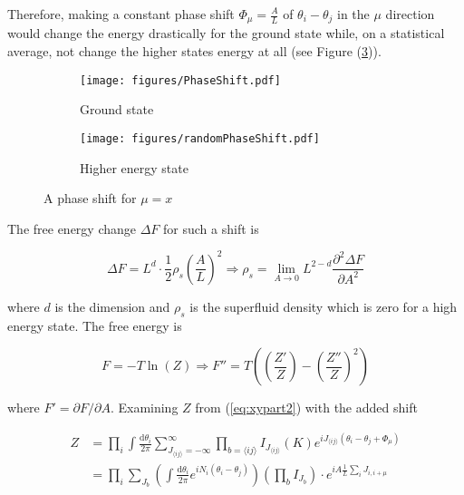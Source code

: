 Therefore, making a constant phase shift $\Phi_\mu = \frac{A}{L}$ of $\theta_i - \theta_j$ in the $\mu$ direction would change the energy drastically for the ground state while, on a statistical average, not change the higher states energy at all (see Figure (\ref{fig:xyphaseshift})).

\begin{figure}[h!]
\centering
    \begin{subfigure}{.4\textwidth}
        \centering
        \texttt{[image: figures/PhaseShift.pdf]}
        \caption{Ground state}
        \label{fig:xyground}
    \end{subfigure}
    \begin{subfigure}{.4\textwidth}
        \centering
        \texttt{[image: figures/randomPhaseShift.pdf]}
        \caption{Higher energy state}
        \label{fig:xyhigher}
    \end{subfigure}
    \caption{A phase shift for $\mu = x$}
\label{fig:xyphaseshift}
\end{figure}

The free energy change $\Delta F$ for such a shift is

\begin{equation}
    \Delta F = L^d \cdot \frac{1}{2} \rho_s \left( \frac{A}{L} \right)^2 \Rightarrow \rho_s = \lim_{A \to 0} L^{2 - d}\frac{\partial^2 \Delta F}{\partial A^2}
\end{equation}

where $d$ is the dimension and $\rho_s$ is the superfluid density which is zero for a high energy state. The free energy is

\begin{equation}
F = - T \ln(Z) \Rightarrow F'' = T \left(\left(\frac{Z'}{Z}\right) - \left( \frac{Z''}{Z} \right)^2 \right)
\label{eq:xyfreeenergy}
\end{equation}

where $F' = \partial F / \partial A$. Examining $Z$ from (\ref{eq:xypart2}) with the added shift

\begin{align}
    Z &= \prod_i \int \frac{\mathrm d \theta_i}{2 \pi} \sum_{J_{\langle ij \rangle} = -\infty}^{\infty} \prod_{b = \langle ij \rangle} I_{J_{\langle ij \rangle}} ( K ) e^{i J_{\langle ij \rangle} (\theta_i - \theta_j + \Phi_\mu)} \\
%
    & = \prod_i \sum_{J_b} \left ( \int \frac{\mathrm d \theta_i}{2 \pi} e^{i N_i (\theta_i - \theta_j)} \right ) \left ( \prod_b I_{J_b} \right ) \cdot e^{i A \frac{1}{L} \sum_i J_{i, i+\mu}} \\
\label{eq:xypart3}
\end{align}

